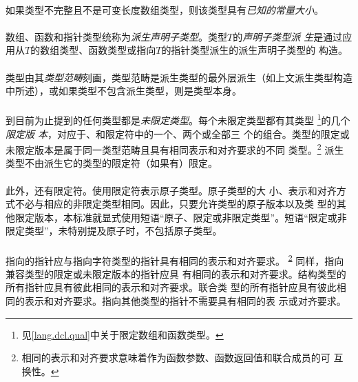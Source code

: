 \paragraph{}
如果类型不完整且不是可变长度数组类型，则该类型具有\textit{已知的常量大小}。

\paragraph{}
数组、函数和指针类型统称为\textit{派生声明子类型}。类型$T$的\textit{声明子类型派
生}是通过应用从$T$的数组类型、函数类型或指向$T$的指针类型派生的派生声明子类型的
构造。

\paragraph{}
类型由其\textit{类型范畴}刻画，类型范畴是派生类型的最外层派生（如上文派生类型构造
中所述），或如果类型不包含派生类型，则是类型本身。

\paragraph{}
到目前为止提到的任何类型都是\textit{未限定类型}。每个未限定类型都有其类型
\footnote{见\ref{lang.dcl.qual}中关于限定数组和函数类型。}的几个\textit{限定版
本}，对应于、和限定符中的一个、两个或全部三
个的组合。类型的限定或未限定版本是属于同一类型范畴且具有相同表示和对齐要求的不同
类型。\footnote{相同的表示和对齐要求意味着作为函数参数、函数返回值和联合成员的可
互换性。\label{interchg}} 派生类型不由派生它的类型的限定符（如果有）限定。

\paragraph{}
此外，还有限定符。使用限定符表示原子类型。原子类型的大
小、表示和对齐方式不必与相应的非限定类型相同。因此，只要允许类型的原子版本以及类
型的其他限定版本，本标准就显式使用短语``原子、限定或非限定类型''。短语``限定或非
限定类型''，未特别提及原子时，不包括原子类型。

\paragraph{}
指向的指针应与指向字符类型的指针具有相同的表示和对齐要求。
\textsuperscript{\ref{interchg}} 同样，指向兼容类型的限定或未限定版本的指针应具
有相同的表示和对齐要求。结构类型的所有指针应具有彼此相同的表示和对齐要求。联合类
型的所有指针应具有彼此相同的表示和对齐要求。指向其他类型的指针不需要具有相同的表
示或对齐要求。


